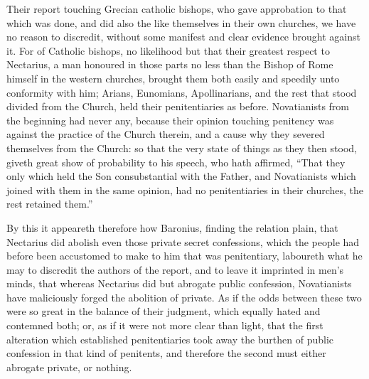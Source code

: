 Their report touching Grecian catholic bishops, who gave approbation to that which was done, and did also the like themselves in their own churches, we have no reason to discredit, without some manifest and clear evidence brought against it. For of Catholic bishops, no likelihood but that their greatest respect to Nectarius, a man honoured in those  parts no less than the Bishop of Rome himself in the western churches, brought them both easily and speedily unto conformity with him; Arians, Eunomians, Apollinarians, and the rest that stood divided from the Church, held their penitentiaries as before. Novatianists from the beginning had never any, because their opinion touching penitency was against the practice of the Church therein, and a cause why they severed themselves from the Church: so that the very state of things as they then stood, giveth great show of probability to his speech, who hath affirmed, “That they only which held the Son consubstantial with the Father, and Novatianists which joined with them in the same opinion, had no penitentiaries in their churches, the rest retained them.”

By this it appeareth therefore how Baronius, finding the relation plain, that Nectarius did abolish even those private secret confessions, which the people had before been accustomed to make to him that was penitentiary, laboureth what he may to discredit the authors of the report, and to leave it imprinted in men’s minds, that whereas Nectarius did but abrogate public confession, Novatianists have maliciously forged the abolition of private. As if the odds between these two were so great in the balance of their judgment, which equally hated and contemned both; or, as if it were not more clear than light, that the first alteration which established penitentiaries took away the burthen of public confession in that kind of penitents, and therefore the second must either abrogate private, or nothing.

